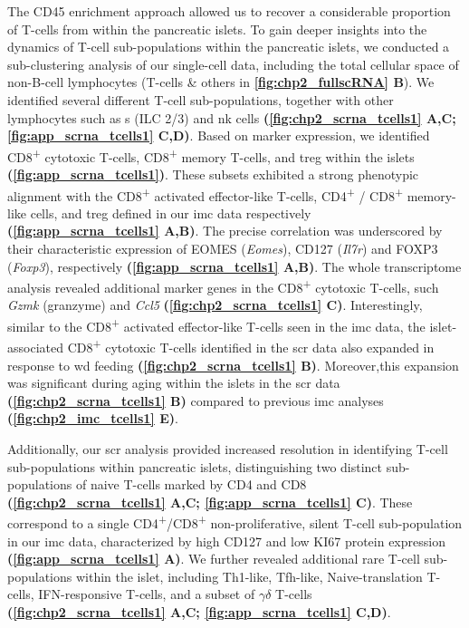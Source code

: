 \par The CD45 enrichment approach allowed us to recover a considerable proportion of T-cells from within the pancreatic islets. To gain deeper insights into the dynamics of T-cell sub-populations within the pancreatic islets, we conducted a sub-clustering analysis of our single-cell data, including the total cellular space of non-B-cell lymphocytes (T-cells \& others in \textbf{\autoref{fig:chp2_fullscRNA} B}). We identified several different T-cell sub-populations, together with other lymphocytes such as s (ILC 2/3) and \acrfull{nk} cells \textbf{(\autoref{fig:chp2_scrna_tcells1} A,C; \autoref{fig:app_scrna_tcells1} C,D)}. %
Based on marker expression, we identified  CD8\textsuperscript{+} cytotoxic T-cells, CD8\textsuperscript{+} memory T-cells, and \gls{treg} within the islets \textbf{(\autoref{fig:app_scrna_tcells1})}. These subsets exhibited a strong phenotypic alignment with the CD8\textsuperscript{+} activated effector-like T-cells, CD4\textsuperscript{+} / CD8\textsuperscript{+} memory-like cells, and \gls{treg} defined in our \gls{imc} data respectively \textbf{(\autoref{fig:app_scrna_tcells1} A,B)}. The precise correlation was underscored by their characteristic expression of EOMES (\textit{Eomes}), CD127 (\textit{Il7r}) and FOXP3 (\textit{Foxp3}), respectively \textbf{(\autoref{fig:app_scrna_tcells1} A,B)}. The whole transcriptome analysis revealed additional marker genes in the CD8\textsuperscript{+} cytotoxic T-cells, such \textit{Gzmk} (granzyme) and \textit{Ccl5} \textbf{(\autoref{fig:chp2_scrna_tcells1} C)}. Interestingly, similar to the CD8\textsuperscript{+} activated effector-like T-cells seen in the \gls{imc} data, the islet-associated CD8\textsuperscript{+} cytotoxic T-cells identified in the \gls{scr} data also expanded in response to \gls{wd} feeding \textbf{(\autoref{fig:chp2_scrna_tcells1} B)}. Moreover,this expansion was significant during aging within the islets in the \gls{scr} data \textbf{(\autoref{fig:chp2_scrna_tcells1} B)} compared to previous \gls{imc} analyses \textbf{(\autoref{fig:chp2_imc_tcells1} E)}.\\

\par Additionally, our \gls{scr} analysis provided increased resolution in identifying T-cell sub-populations within pancreatic islets, distinguishing two distinct sub-populations of naive T-cells marked by CD4 and CD8 \textbf{(\autoref{fig:chp2_scrna_tcells1} A,C; \autoref{fig:app_scrna_tcells1} C)}. These correspond to a single CD4\textsuperscript{+}/CD8\textsuperscript{+} non-proliferative, silent T-cell sub-population in our \gls{imc} data, characterized by high CD127 and low KI67 protein expression \textbf{(\autoref{fig:app_scrna_tcells1} A)}. We further revealed additional rare T-cell sub-populations within the islet, including Th1-like, Tfh-like, Naive-translation T-cells, IFN-responsive T-cells, and a subset of $\gamma\delta$ T-cells \textbf{(\autoref{fig:chp2_scrna_tcells1} A,C; \autoref{fig:app_scrna_tcells1} C,D)}.\\


